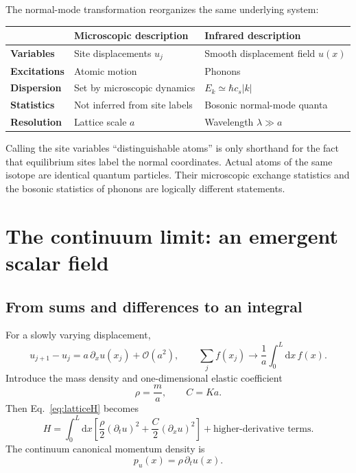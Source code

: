\documentclass[11pt]{article}
\newcommand{\dd}{\mathrm{d}}
\begin{document}
The normal-mode transformation reorganizes the same underlying system:
\begin{center}
\begin{tabular}{>{\bfseries}p{} p{} p{}}
 & Microscopic description & Infrared description \\
\toprule
Variables & Site displacements $u_j$ & Smooth displacement field $u(x)$ \\
Excitations & Atomic motion & Phonons \\
Dispersion & Set by microscopic dynamics & $E_k\simeq\hbar c_s|k|$ \\
Statistics & Not inferred from site labels & Bosonic normal-mode quanta \\
Resolution & Lattice scale $a$ & Wavelength $\lambda\gg a$ \\
\bottomrule
\end{tabular}
\end{center}

Calling the site variables ``distinguishable atoms'' is only shorthand for
the fact that equilibrium sites label the normal coordinates.  Actual atoms
of the same isotope are identical quantum particles.  Their microscopic
exchange statistics and the bosonic statistics of phonons are logically
different statements.

\section{The continuum limit: an emergent scalar field}

\subsection{From sums and differences to an integral}

For a slowly varying displacement,
\begin{equation}
  u_{j+1}-u_j
  =a\,\partial_xu(x_j)+\mathcal O(a^2),
  \qquad
  \sum_j f(x_j)\longrightarrow\frac1a\int_0^L\dd x\,f(x).
  \label{eq:continuumrules}
\end{equation}
Introduce the mass density and one-dimensional elastic coefficient
\begin{equation}
  \rho=\frac ma,
  \qquad
  C=Ka.
  \label{eq:rhoC}
\end{equation}
Then Eq.~\eqref{eq:latticeH} becomes
\begin{equation}
  H
  =\int_0^L\dd x\left[
    \frac{\rho}{2}(\partial_tu)^2
    +\frac{C}{2}(\partial_xu)^2
  \right]
  +\text{higher-derivative terms}.
  \label{eq:Hcontinuumu}
\end{equation}
The continuum canonical momentum density is
\begin{equation}
  p_u(x)=\rho\,\partial_tu(x).
\end{equation}
\end{document}

